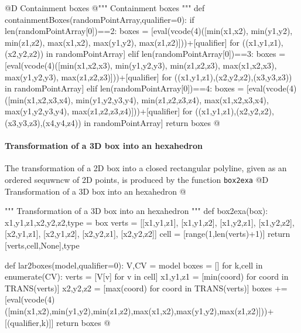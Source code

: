 \documentclass[11pt,oneside]{article}    %
\begin{document}
@D Containment boxes
@{""" Containment boxes """
def containmentBoxes(randomPointArray,qualifier=0):
    if len(randomPointArray[0])==2:
        boxes = [eval(vcode(4)([min(x1,x2), min(y1,y2), min(z1,z2), 
                             max(x1,x2), max(y1,y2), max(z1,z2)]))+[qualifier]
                for ((x1,y1,z1),(x2,y2,z2)) in randomPointArray]
    elif len(randomPointArray[0])==3:
        boxes = [eval(vcode(4)([min(x1,x2,x3), min(y1,y2,y3), min(z1,z2,z3), 
                             max(x1,x2,x3), max(y1,y2,y3), max(z1,z2,z3)]))+[qualifier]
                for ((x1,y1,z1),(x2,y2,z2),(x3,y3,z3)) in randomPointArray]
    elif len(randomPointArray[0])==4:
        boxes = [eval(vcode(4)([min(x1,x2,x3,x4), min(y1,y2,y3,y4), min(z1,z2,z3,z4), 
                             max(x1,x2,x3,x4), max(y1,y2,y3,y4), max(z1,z2,z3,z4)]))+[qualifier]
                for ((x1,y1,z1),(x2,y2,z2),(x3,y3,z3),(x4,y4,z4)) in randomPointArray]
    return boxes
@}

    
\paragraph{Transformation of a 3D box into an hexahedron}
The transformation of a 2D box into a closed rectangular polyline, given as an ordered sequwncw of 2D points, is produced by the function \texttt{box2exa}
@D Transformation of a 3D box into an hexahedron
@{""" Transformation of a 3D box into an hexahedron """    
def box2exa(box):
    x1,y1,z1,x2,y2,z2,type = box
    verts = [[x1,y1,z1], [x1,y1,z2], [x1,y2,z1], [x1,y2,z2], [x2,y1,z1], [x2,y1,z2], [x2,y2,z1], [x2,y2,z2]]
    cell = [range(1,len(verts)+1)]
    return [verts,cell,None],type

def lar2boxes(model,qualifier=0):
    V,CV = model
    boxes = []
    for k,cell in enumerate(CV):
        verts = [V[v] for v in cell]
        x1,y1,z1 = [min(coord) for coord in TRANS(verts)]
        x2,y2,z2 = [max(coord) for coord in TRANS(verts)]
        boxes += [eval(vcode(4)([min(x1,x2),min(y1,y2),min(z1,z2),max(x1,x2),max(y1,y2),max(z1,z2)]))+[(qualifier,k)]]
    return boxes
@}



\end{document}
